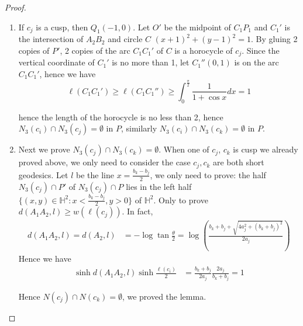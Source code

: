 \documentclass[11pt, a4paper]{article}
\theoremstyle{definition}
\theoremstyle{remark}
\newcommand{\bbh}{\mathbb{H}}
\newcommand{\bracket}[1]{\left( #1 \right)}
\begin{document}
\begin{proof}
\begin{enumerate}
\item
If $c_j$ is a cusp, then $Q_1(-1,0)$. Let $O'$ be the midpoint of $C_1P_1$ and $C_1'$ is the intersection of $A_2B_2$ and circle $C$ $(x+1)^2+(y-1)^2=1$. By gluing 2 copies of $P'$, 2 copies of the arc $C_1C_1'$ of $C$ is a horocycle of $c_j$. Since the vertical coordinate of $C_1'$ is no more than 1, let $C_1''(0,1)$ is on the arc $C_1C_1'$, hence we have
$$\ell(C_1C_1')\geqslant\ell(C_1C_1'')\geqslant\int^{\frac{\pi}2}_{0}\frac1{1+\cos x}dx=1$$

 hence the length of the horocycle is no less than 2, hence $N_3(c_i)\cap N_3(c_j)=\emptyset$ in $P$, similarly $N_3(c_i)\cap N_3(c_k)=\emptyset$ in $P$.

\item
Next we prove $N_3(c_j)\cap N_3(c_k)=\emptyset$. When one of $c_j$, $c_k$ is cusp we already proved above, we only need to consider the case $c_j,c_k$ are both short geodesics. Let $l$ be the line $x=\frac{b_k-b_j}2$, we only need to prove: the half $N_3(c_j)\cap P'$ of $N_3(c_j)\cap P$ lies in the left half $\{(x,y)\in\bbh^2:x<\frac{b_k-b_j}2,y>0\}$ of $\bbh^2$. Only to prove $d(A_1A_2,l)\geqslant w(\ell(c_j))$. In fact,
\begin{align*}
 d(A_1A_2,l)=d(A_2,l)&=-\log\tan\frac{\theta}2=\log\bracket{\frac{b_k+b_j+\sqrt{4a_j^2+(b_k+b_j)^2}}{2a_j}}
\end{align*}
Hence we have
\begin{align*}
 \sinh{d(A_1A_2,l)}\sinh{\frac{\ell(c_i)}2}&=\frac{b_k+b_j}{2a_j}\frac{2a_j}{b_k+b_j}=1
\end{align*}


Hence $N(c_j)\cap N(c_k)=\emptyset$, we proved the lemma.

\end{enumerate}


\end{proof}
\end{document}
